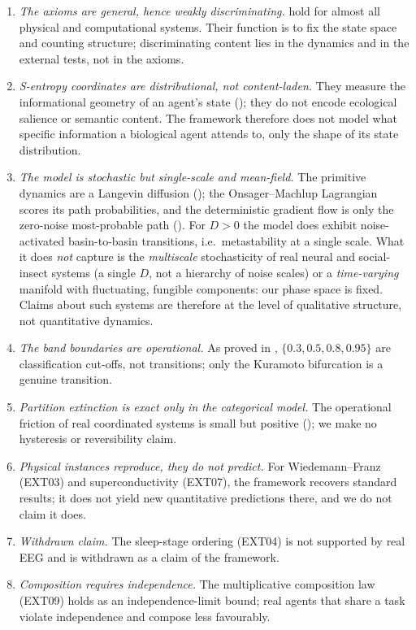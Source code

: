 \documentclass[11pt,twocolumn,a4paper]{article}
\begin{document}
\begin{enumerate}[leftmargin=*]
\item \emph{The axioms are general, hence weakly discriminating.}
 hold for almost all physical and
computational systems. Their function is to fix the state space and counting
structure; discriminating content lies in the dynamics and in the external
tests, not in the axioms.

\item \emph{S-entropy coordinates are distributional, not content-laden.} They
measure the informational geometry of an agent's state
(); they do not encode ecological salience or semantic
content. The framework therefore does not model what specific information a
biological agent attends to, only the shape of its state distribution.

\item \emph{The model is stochastic but single-scale and mean-field.} The
primitive dynamics are a Langevin diffusion (); the
Onsager--Machlup Lagrangian scores its path probabilities, and the deterministic
gradient flow is only the zero-noise most-probable path
(). For $D>0$ the model does exhibit noise-activated
basin-to-basin transitions, i.e.\ metastability at a single scale. What it does
\emph{not} capture is the \emph{multiscale} stochasticity of real neural and
social-insect systems (a single $D$, not a hierarchy of noise scales) or a
\emph{time-varying} manifold with fluctuating, fungible components: our phase
space is fixed. Claims about such systems are therefore at the level of
qualitative structure, not quantitative dynamics.

\item \emph{The band boundaries are operational.} As proved in
, $\{0.3,0.5,0.8,0.95\}$ are classification cut-offs,
not transitions; only the Kuramoto bifurcation is a genuine transition.

\item \emph{Partition extinction is exact only in the categorical model.} The
operational friction of real coordinated systems is small but positive
(); we make no hysteresis or reversibility
claim.

\item \emph{Physical instances reproduce, they do not predict.} For
Wiedemann--Franz (EXT03) and superconductivity (EXT07), the framework recovers
standard results; it does not yield new quantitative predictions there, and we
do not claim it does.

\item \emph{Withdrawn claim.} The sleep-stage ordering (EXT04) is not supported
by real EEG and is withdrawn as a claim of the framework.

\item \emph{Composition requires independence.} The multiplicative composition
law (EXT09) holds as an independence-limit bound; real agents that share a task
violate independence and compose less favourably.
\end{enumerate}
\end{document}
